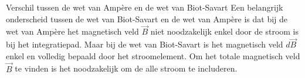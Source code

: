 \begin{vrg}{Verschil tussen de wet van Ampère en de wet van Biot-Savart}
    Een belangrijk onderscheid tussen de wet van Biot-Savart en de wet van Ampère is dat bij de wet van Ampère
    het magnetisch veld $\Vec{B}$ niet noodzakelijk enkel door de stroom is bij het integratiepad. Maar bij de wet
    van Biot-Savart is het magnetisch veld $d\Vec{B}$ enkel en volledig bepaald door het stroomelement.
    Om het totale magnetisch veld $\Vec{B}$ te vinden is het noodzakelijk om de alle stroom te includeren.
\end{vrg}

\newpage